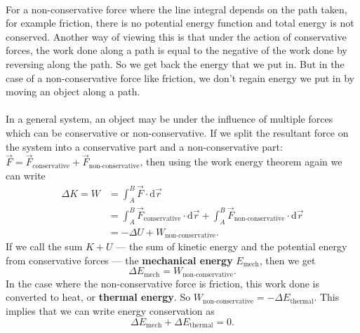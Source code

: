 \documentclass[../classical_mechanics.tex]{subfiles}
\begin{document}
        \paragraph{}
        For a non-conservative force where the line integral depends on the path taken, for example friction, there is no potential energy function and total energy is not conserved.
        Another way of viewing this is that under the action of conservative forces, the work done along a path is equal to the negative of the work done by reversing along the path.
        So we get back the energy that we put in.
        But in the case of a non-conservative force like friction, we don't regain energy we put in by moving an object along a path.

        \paragraph{}
        In a general system, an object may be under the influence of multiple forces which can be conservative or non-conservative.
        If we split the resultant force on the system into a conservative part and a non-conservative part: $\vec{F}=\vec{F}_\text{conservative}+\vec{F}_\text{non-conservative}$, then using the work energy theorem again we can write
        \begin{align}
            \Delta K = W &= \int_A^B \vec{F}\cdot\mathrm{d}\vec{r}\\
            &= \int_A^B \vec{F}_\text{conservative}\cdot\mathrm{d}\vec{r} + \int_A^B \vec{F}_\text{non-conservative}\cdot\mathrm{d}\vec{r}\\
            &= - \Delta U + W_\text{non-conservative}.
        \end{align}
        If we call the sum $K+U$ --- the sum of kinetic energy and the potential energy from conservative forces --- the \textbf{mechanical energy} $E_\text{mech}$, then we get
        \begin{equation}
            \Delta E_\text{mech} = W_\text{non-conservative}.
        \end{equation}
        In the case where the non-conservative force is friction, this work done is converted to heat, or \textbf{thermal energy}.
        So $W_\text{non-conservative} = -\Delta E_\text{thermal}$.
        This implies that we can write energy conservation as
        \begin{equation}
            \Delta E_\text{mech} + \Delta E_\text{thermal} = 0.
        \end{equation}
\end{document}
